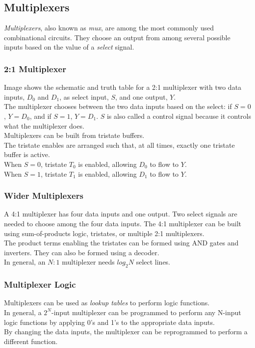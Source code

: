 \documentclass[12pt]{article}
\theoremstyle{definition}
\begin{document}
  \subsection{Multiplexers}
  \emph{Multiplexers}, also known as \emph{mux}, are among the most commonly used combinational circuits.
  They choose an output from among several possible inputs based on the value of a \emph{select} signal.

  \subsubsection{2:1 Multiplexer}
  Image shows the schematic and truth table for a 2:1 multiplexer with two data inputs, $D_0$ and $D_1$, as select input, $S$, and one output, $Y$. \\
  The multiplexer chooses between the two data inputs based on the select: if $S = 0$, $Y = D_0$, and if $S = 1$, $Y = D_1$.
  $S$ is also called a control signal because it controls what the multiplexer does. \\

  Multiplexers can be built from tristate buffers. \\
  The tristate enables are arranged such that, at all times, exactly one tristate buffer is active. \\
  When $S = 0$, tristate $T_0$ is enabled, allowing $D_0$ to flow to $Y$. \\
  When $S = 1$, tristate $T_1$ is enabled, allowing $D_1$ to flow to $Y$.

  \subsubsection{Wider Multiplexers}
  A 4:1 multiplexer has four data inputs and one output.
  Two select signals are needed to choose among the four data inputs.
  The 4:1 multiplexer can be built using sum-of-products logic, tristates, or multiple 2:1 multiplexers. \\

  The product terms enabling the tristates can be formed using AND gates and inverters.
  They can also be formed using a decoder. \\

  In general, an $N:1$ multiplexer needs $log_{2} N$ select lines.

  \subsubsection{Multiplexer Logic}
  Multiplexers can be used as \emph{lookup tables} to perform logic functions. \\
  In general, a $2^{N}$-input multiplexer can be programmed to perform any N-input logic functions by applying 0's and 1's to the appropriate data inputs. \\
  By changing the data inputs, the multiplexer can be reprogrammed to perform a different function.
\end{document}

